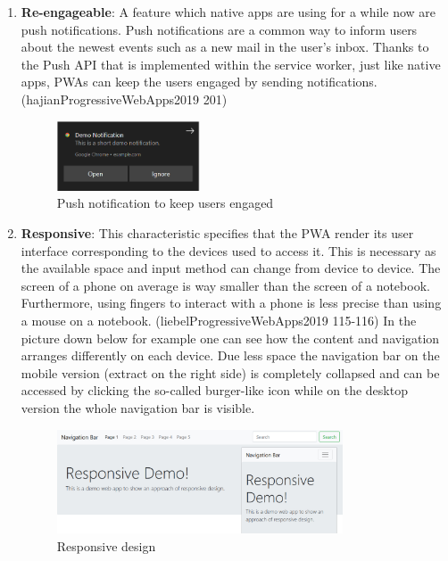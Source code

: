 \begin{enumerate}
	\item \textbf{Re-engageable}: A feature which native apps are using for a while now are push notifications. Push notifications are a common way to inform users about the newest events such as a new mail in the user’s inbox. Thanks to the Push API that is implemented within the service worker, just like native apps, PWAs can keep the users engaged by sending notifications. (hajianProgressiveWebApps2019 201)

\begin{figure}[htbp] 
	\centering
	\includegraphics[width=0.4\textwidth]{Assets/chapter_pwa/demonotification.PNG}
	\caption{Push notification to keep users engaged}
	\label{fig:pwa_reengageable}
\end{figure}

	\item \textbf{Responsive}: This characteristic specifies that the PWA render its user interface corresponding to the devices used to access it. This is necessary as the available space and input method can change from device to device. The screen of a phone on average is way smaller than the screen of a notebook. Furthermore, using fingers to interact with a phone is less precise than using a mouse on a notebook. (liebelProgressiveWebApps2019 115-116) In the picture down below for example one can see how the content and navigation arranges differently on each device. Due less space the navigation bar on the mobile version (extract on the right side) is completely collapsed and can be accessed by clicking the so-called burger-like icon while on the desktop version the whole navigation bar is visible.

\begin{figure}[htbp] 
	\centering
	\includegraphics[width=0.8\textwidth]{Assets/chapter_pwa/responsive-overall.jpg}
	\caption{Responsive design}
	\label{fig:pwa_responsive}
\end{figure}


\end{enumerate}
